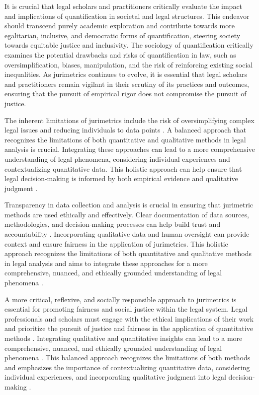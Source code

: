 It is crucial that legal scholars and practitioners critically evaluate the impact and implications of quantification in societal and legal structures. This endeavor should transcend purely academic exploration and contribute towards more egalitarian, inclusive, and democratic forms of quantification, steering society towards equitable justice and inclusivity. The sociology of quantification critically examines the potential drawbacks and risks of quantification in law, such as oversimplification, biases, manipulation, and the risk of reinforcing existing social inequalities. As jurimetrics continues to evolve, it is essential that legal scholars and practitioners remain vigilant in their scrutiny of its practices and outcomes, ensuring that the pursuit of empirical rigor does not compromise the pursuit of justice.

The inherent limitations of jurimetrics include the risk of oversimplifying complex legal issues and reducing individuals to data points \cite{10.1590/data.2022.65.3.267,10.1080/07329113.2015.1046739}. A balanced approach that recognizes the limitations of both quantitative and qualitative methods in legal analysis is crucial. Integrating these approaches can lead to a more comprehensive understanding of legal phenomena, considering individual experiences and contextualizing quantitative data. This holistic approach can help ensure that legal decision-making is informed by both empirical evidence and qualitative judgment \cite{mendes2016}.

Transparency in data collection and analysis is crucial in ensuring that jurimetric methods are used ethically and effectively. Clear documentation of data sources, methodologies, and decision-making processes can help build trust and accountability \cite{unger2021process}. Incorporating qualitative data and human oversight can provide context and ensure fairness in the application of jurimetrics. This holistic approach recognizes the limitations of both quantitative and qualitative methods in legal analysis and aims to integrate these approaches for a more comprehensive, nuanced, and ethically grounded understanding of legal phenomena \cite{10.1590/data.2022.65.3.267,10.1057/s41599-020-00557-0}.

A more critical, reflexive, and socially responsible approach to jurimetrics is essential for promoting fairness and social justice within the legal system. Legal professionals and scholars must engage with the ethical implications of their work and prioritize the pursuit of justice and fairness in the application of quantitative methods \cite{10.5040/9781350220645,10.1080/07329113.2015.1046739}. Integrating qualitative and quantitative insights can lead to a more comprehensive, nuanced, and ethically grounded understanding of legal phenomena \cite{10.5040/9781350220645,10.1080/07329113.2015.1046739}. This balanced approach recognizes the limitations of both methods and emphasizes the importance of contextualizing quantitative data, considering individual experiences, and incorporating qualitative judgment into legal decision-making \cite{10.5040/9781350220645,10.1080/07329113.2015.1046739}.

